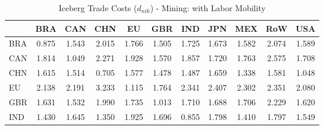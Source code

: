 \begin{table}[htbp]
\centering
\caption{Iceberg Trade Costs ($d_{nik}$) - Mining: with Labor Mobility} 
\label{tab:iceberg_Mining}
\begin{tabular}{lcccccccccc}
  \hline
 & BRA & CAN & CHN & EU & GBR & IND & JPN & MEX & RoW & USA \\ 
  \hline
BRA & \textcolor[RGB]{245,158,10}{0.875} & \textcolor[RGB]{163,106,92}{1.543} & \textcolor[RGB]{56,36,199}{2.015} & \textcolor[RGB]{102,66,153}{1.766} & \textcolor[RGB]{171,111,84}{1.505} & \textcolor[RGB]{112,73,143}{1.725} & \textcolor[RGB]{130,84,125}{1.673} & \textcolor[RGB]{150,97,105}{1.582} & \textcolor[RGB]{51,33,204}{2.074} & \textcolor[RGB]{148,96,107}{1.589} \\ 
  CAN & \textcolor[RGB]{89,58,166}{1.814} & \textcolor[RGB]{232,150,23}{1.049} & \textcolor[RGB]{25,16,230}{2.271} & \textcolor[RGB]{74,48,181}{1.928} & \textcolor[RGB]{158,102,97}{1.570} & \textcolor[RGB]{82,53,173}{1.857} & \textcolor[RGB]{115,74,140}{1.720} & \textcolor[RGB]{107,69,148}{1.763} & \textcolor[RGB]{8,5,247}{2.575} & \textcolor[RGB]{120,78,135}{1.708} \\ 
  CHN & \textcolor[RGB]{145,94,110}{1.615} & \textcolor[RGB]{168,109,87}{1.514} & \textcolor[RGB]{252,163,3}{0.705} & \textcolor[RGB]{156,101,99}{1.577} & \textcolor[RGB]{178,115,76}{1.478} & \textcolor[RGB]{176,114,79}{1.487} & \textcolor[RGB]{133,86,122}{1.659} & \textcolor[RGB]{199,129,56}{1.338} & \textcolor[RGB]{153,99,102}{1.581} & \textcolor[RGB]{235,152,20}{1.048} \\ 
  EU & \textcolor[RGB]{46,30,209}{2.138} & \textcolor[RGB]{41,26,214}{2.191} & \textcolor[RGB]{0,0,255}{3.233} & \textcolor[RGB]{230,148,26}{1.115} & \textcolor[RGB]{105,68,150}{1.764} & \textcolor[RGB]{15,10,240}{2.341} & \textcolor[RGB]{10,7,245}{2.407} & \textcolor[RGB]{20,13,235}{2.302} & \textcolor[RGB]{13,8,242}{2.351} & \textcolor[RGB]{48,31,207}{2.080} \\ 
  GBR & \textcolor[RGB]{140,91,115}{1.631} & \textcolor[RGB]{166,107,89}{1.532} & \textcolor[RGB]{61,40,194}{1.990} & \textcolor[RGB]{110,71,145}{1.735} & \textcolor[RGB]{240,155,15}{1.013} & \textcolor[RGB]{117,76,138}{1.710} & \textcolor[RGB]{128,82,128}{1.688} & \textcolor[RGB]{122,79,133}{1.706} & \textcolor[RGB]{31,20,224}{2.229} & \textcolor[RGB]{143,92,112}{1.620} \\ 
  IND & \textcolor[RGB]{186,120,69}{1.430} & \textcolor[RGB]{135,87,120}{1.645} & \textcolor[RGB]{196,127,59}{1.350} & \textcolor[RGB]{77,50,178}{1.925} & \textcolor[RGB]{125,81,130}{1.696} & \textcolor[RGB]{247,160,8}{0.855} & \textcolor[RGB]{92,59,163}{1.798} & \textcolor[RGB]{189,122,66}{1.410} & \textcolor[RGB]{94,61,161}{1.797} & \textcolor[RGB]{161,104,94}{1.549} \\ 

\end{tabular}
\end{table}
